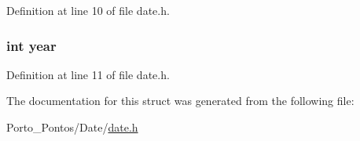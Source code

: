 Definition at line 10 of file date.\+h.

\hypertarget{structdate_abeac221e38b7b9ce7df8722c842bf671}{}
\subsubsection[{year}]{\setlength{\rightskip}{0pt plus 5cm}int year}\label{structdate_abeac221e38b7b9ce7df8722c842bf671}


Definition at line 11 of file date.\+h.



The documentation for this struct was generated from the following file\+:\begin{DoxyCompactItemize}
\item 
Porto\+\_\+\+Pontos/\+Date/\hyperlink{date_8h}{date.\+h}\end{DoxyCompactItemize}
